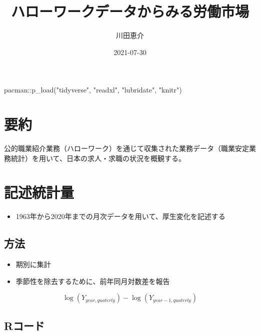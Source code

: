 \documentclass[
]{book}
\title{ハローワークデータからみる労働市場}
\author{川田恵介}
\date{2021-07-30}
\newenvironment{Shaded}{\begin{snugshade}}{\end{snugshade}}
\newcommand{\FunctionTok}[1]{\textcolor[rgb]{0.00,0.00,0.00}{#1}}
\newcommand{\NormalTok}[1]{#1}
\newcommand{\SpecialCharTok}[1]{\textcolor[rgb]{0.00,0.00,0.00}{#1}}
\newcommand{\StringTok}[1]{\textcolor[rgb]{0.31,0.60,0.02}{#1}}
\providecommand{\tightlist}{%
  \setlength{\itemsep}{0pt}\setlength{\parskip}{0pt}}
\begin{document}
\maketitle

{
\setcounter{tocdepth}{1}
\tableofcontents
}
\begin{Shaded}
\begin{Highlighting}[]
\NormalTok{pacman}\SpecialCharTok{::}\FunctionTok{p\_load}\NormalTok{(}\StringTok{"tidyverse"}\NormalTok{,}
               \StringTok{"readxl"}\NormalTok{,}
               \StringTok{"lubridate"}\NormalTok{,}
               \StringTok{"knitr"}\NormalTok{)}
\end{Highlighting}
\end{Shaded}

\hypertarget{ux8981ux7d04}{%
\chapter{要約}\label{ux8981ux7d04}}

公的職業紹介業務（ハローワーク）を通じて収集された業務データ（職業安定業務統計）を用いて、日本の求人・求職の状況を概観する。

\hypertarget{ux8a18ux8ff0ux7d71ux8a08ux91cf}{%
\chapter{記述統計量}\label{ux8a18ux8ff0ux7d71ux8a08ux91cf}}

\begin{itemize}
\tightlist
\item
  1963年から2020年までの月次データを用いて、厚生変化を記述する
\end{itemize}

\hypertarget{ux65b9ux6cd5}{%
\section{方法}\label{ux65b9ux6cd5}}

\begin{itemize}
\item
  期別に集計
\item
  季節性を除去するために、前年同月対数差を報告
\end{itemize}

\[\log(Y_{year,quaterly})-\log(Y_{year-1,quaterly})\]

\hypertarget{rux30b3ux30fcux30c9}{%
\section{Rコード}\label{rux30b3ux30fcux30c9}}
\end{document}
